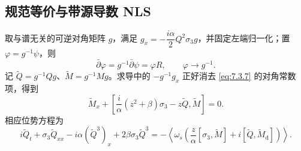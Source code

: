 \documentclass[lang=cn,scheme=chinese,mode=simple,device=normal,color=blue,math=cm,thmcnt=section,12pt]{elegantbook}
\newcommand{\eqq}[2]{\tag{#1}\label{eq:#1}#2}
\begin{document}
\subsection{规范等价与带源导数 NLS}
取与谱无关的可逆对角矩阵 $g$，满足
$g_x=-\dfrac{i\alpha}{2}Q^2\sigma_3g$，并固定左端归一化；置 $\varphi=g^{-1}\psi$，则
\begin{equation}
\eqq{7.3.19}{\bar\partial\varphi=g^{-1}\bar\partial\psi=\varphi R,\qquad \varphi\to g^{-1}.}
\end{equation}
记 $\widetilde Q=g^{-1}Qg$、$\widetilde M=g^{-1}Mg$。求导中的 $-g^{-1}g_x$ 正好消去 \eqref{eq:7.3.7} 的对角常数项，得到
\begin{equation}
\eqq{7.3.20}{\widetilde M_x+\left[\dfrac{i}{\alpha}(z^2+\beta)\sigma_3-z\widetilde Q,\widetilde M\right]=0.}
\end{equation}
相应位势方程为
\begin{equation}
\eqq{7.3.21}{i\widetilde Q_t+\sigma_3\widetilde Q_{xx}-i\alpha(\widetilde Q^3)_x+2\beta\sigma_3\widetilde Q^3
=-\left\langle\omega_s\left(\dfrac{z}{\alpha}[\sigma_3,\widetilde M]+i[\widetilde Q,\widetilde M_{\mathrm d}]\right)\right\rangle.}
\end{equation}
\end{document}
